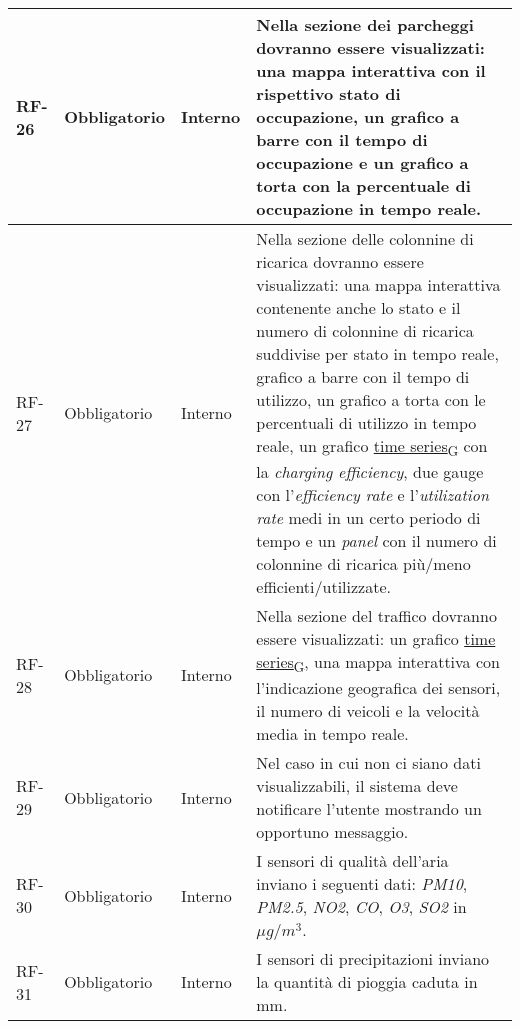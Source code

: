 \begin{longtable}{|>{\centering\arraybackslash}m{}|>{\centering\arraybackslash}m{}|>{\centering\arraybackslash}m{}|>{\centering\arraybackslash}m{}|}
	\\\hline
	RF-26           & Obbligatorio        & Interno                                                                                                           & Nella sezione dei parcheggi dovranno essere visualizzati: una mappa interattiva con il rispettivo stato di occupazione, un grafico a barre con il tempo di occupazione e un grafico a torta con la percentuale di occupazione in tempo reale.
	\\\hline
	RF-27           & Obbligatorio        & Interno                                                                                                           & Nella sezione delle colonnine di ricarica dovranno essere visualizzati: una mappa interattiva contenente anche lo stato e il numero di colonnine di ricarica suddivise per stato in tempo reale, grafico a barre con il tempo di utilizzo, un grafico a torta con le percentuali di utilizzo in tempo reale, un grafico \href{https://7last.github.io/docs/pb/documentazione-interna/glossario\#time-series}{time series\textsubscript{G}} con la \textit{charging efficiency}, due gauge con l'\textit{efficiency rate} e l'\textit{utilization rate} medi in un certo periodo di tempo e un \textit{panel} con il numero di colonnine di ricarica più/meno efficienti/utilizzate.
	\\\hline
	RF-28           & Obbligatorio        & Interno                                                                                                           & Nella sezione del traffico dovranno essere visualizzati: un grafico \href{https://7last.github.io/docs/pb/documentazione-interna/glossario\#time-series}{time series\textsubscript{G}}, una mappa interattiva con l'indicazione geografica dei sensori, il numero di veicoli e la velocità media in tempo reale.
	\\\hline
	RF-29           & Obbligatorio        & Interno                                                                                                           & Nel caso in cui non ci siano dati visualizzabili, il sistema deve notificare l'utente mostrando un opportuno messaggio.
	\\\hline
	RF-30           & Obbligatorio        & Interno                                                                                                           & I sensori di qualità dell'aria inviano i seguenti dati: \textit{PM10}, \textit{PM2.5}, \textit{NO2}, \textit{CO}, \textit{O3}, \textit{SO2} in $\mu g/m^3$.
	\\\hline
	RF-31           & Obbligatorio        & Interno                                                                                                           & I sensori di precipitazioni inviano la quantità di pioggia caduta in mm.

\end{longtable}
